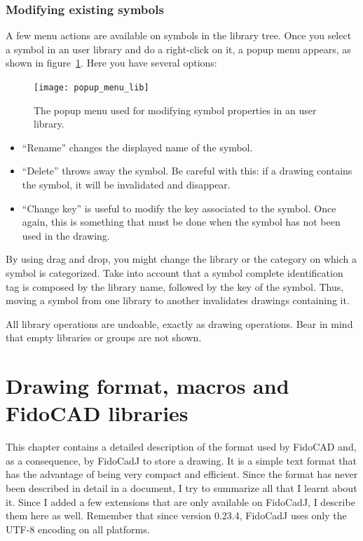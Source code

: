 \documentclass[10pt,a4paper,twoside]{scrreprt}
\begin{document}
\subsection{Modifying existing symbols}
A few menu actions are available on symbols in the library tree. Once you select a symbol in an user library and do a right-click on it, a popup menu appears, as shown in figure~\ref{fig_popup_menu_lib}. Here you have several options:
\begin{figure}
  \begin{center}
    \texttt{[image: popup\_menu\_lib]}
  \end{center}
  \caption{The popup menu used for modifying symbol properties in an user library.}
  \label{fig_popup_menu_lib}
\end{figure}
\begin{itemize}
\item ``Rename'' changes the displayed name of the symbol.
\item ``Delete'' throws away the symbol. Be careful with this: if a drawing contains the symbol, it will be invalidated and disappear.
\item ``Change key'' is useful to modify the key associated to the symbol. Once again, this is something that must be done when the symbol has not been used in the drawing.
\end{itemize}
By using drag and drop, you might change the library or the category on which a symbol is categorized. Take into account that a symbol complete identification tag is composed by the library name, followed by the key of the symbol. Thus, moving a symbol from one library to another invalidates drawings containing it.

All library operations are undoable, exactly as drawing operations. Bear in mind that empty libraries or groups are not shown.

\chapter{Drawing format, macros and FidoCAD libraries} \label{chap_formato}

This chapter contains a detailed description of the format used by
FidoCAD and, as a consequence, by FidoCadJ to store a drawing. It
is a simple text format that has the advantage of being very compact
and efficient. Since the format has never been described in detail
in a document, I try to summarize all that I learnt about it.
Since I added a few extensions that are only available on FidoCadJ, I describe them here as well. Remember that since version 0.23.4, FidoCadJ uses only the UTF-8 encoding on all platforms.
\end{document}
